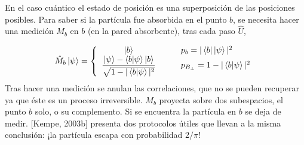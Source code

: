 En el caso cuántico el estado de posición es una superposición de las posiciones posibles. Para saber si la partícula fue absorbida en el punto $b$, se necesita hacer una medición $M_b$ en $b$ (en la pared absorbente), tras cada paso $\hat{U}$,

\begin{equation*}
    \hat{M}_b\ket{\psi}=
    \left\{
    \begin{array}{cl}
        \ket{b} & \qquad p_b=|\bra{b}\ket{\psi}|^2 \\
        \dfrac{\ket{\psi}-\braket{b|\psi}\ket{b}}{\sqrt{1-|\braket{b|\psi}|^2}} &\qquad p_{B_\perp}=1-|\braket{b|\psi}|^2 
    \end{array}
    \right.
\end{equation*}{}
Tras hacer una medición se anulan las correlaciones, que no se pueden recuperar ya que éste es un proceso irreversible. $M_b$ proyecta sobre dos subespacios, el punto $b$ solo, o su complemento. Si se encuentra la partícula en $b$ se deja de medir. [Kempe, 2003b] presenta dos protocolos útiles que llevan a la misma conclusión: ¡la partícula escapa con probabilidad $2/\pi$!